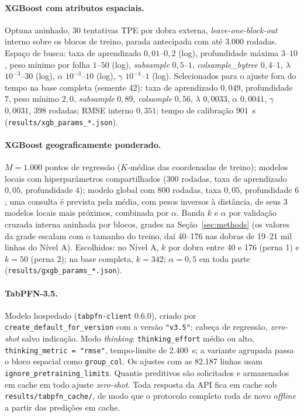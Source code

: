 \documentclass[11pt,a4paper]{article}
\begin{document}
\paragraph{XGBoost com atributos espaciais.} Optuna aninhado, 30 tentativas TPE por dobra
externa, \emph{leave-one-block-out} interno sobre os blocos de treino, parada antecipada com
até 3.000 rodadas. Espaço de busca: taxa de aprendizado $0{,}01$--$0{,}2$ (log), profundidade
máxima $3$--$10$, peso mínimo por folha $1$--$50$ (log), \emph{subsample} $0{,}5$--$1$,
\emph{colsample\_bytree} $0{,}4$--$1$, $\lambda$ $10^{-3}$--$30$ (log), $\alpha$
$10^{-3}$--$10$ (log), $\gamma$ $10^{-4}$--$1$ (log). Selecionados para o ajuste fora do tempo
na base completa (semente 42): taxa de aprendizado $0{,}049$, profundidade $7$, peso mínimo
$2{,}0$, \emph{subsample} $0{,}89$, \emph{colsample} $0{,}56$, $\lambda$ $0{,}0033$, $\alpha$
$0{,}0041$, $\gamma$ $0{,}0031$, $398$ rodadas; RMSE interno $0{,}351$; tempo de calibração
$901$~s (\texttt{results/xgb\_params\_*.json}).

\paragraph{XGBoost geograficamente ponderado.} $M = 1.000$ pontos de regressão ($K$-médias das
coordenadas de treino); modelos locais com hiperparâmetros compartilhados ($300$ rodadas, taxa
de aprendizado $0{,}05$, profundidade $4$); modelo global com $800$ rodadas, taxa $0{,}05$,
profundidade $6$; uma consulta é prevista pela média, com pesos inversos à distância, de seus
$3$ modelos locais mais próximos, combinada por $\alpha$. Banda $k$ e $\alpha$ por validação
cruzada interna aninhada por blocos, grades na Seção~\ref{sec:methods} (os valores da grade
escalam com o tamanho do treino, daí 40--176 nas dobras de 19--21 mil linhas do Nível A).
Escolhidos: no Nível A, $k$ por dobra entre 40 e 176 (perna 1) e $k = 50$ (perna 2); na base
completa, $k = 342$; $\alpha = 0{,}5$ em toda parte
(\texttt{results/gxgb\_params\_*.json}).

\paragraph{TabPFN-3.5.}\sloppy{} Modelo hospedado (\texttt{tabpfn-client} 0.6.0), criado por
\texttt{create\_default\_for\_version} com a versão \texttt{"v3.5"}; cabeça de regressão, \emph{zero-shot} salvo
indicação. Modo \emph{thinking}: \texttt{thinking\_effort} médio ou alto,
\texttt{thinking\_metric = "rmse"}, tempo-limite de 2.400~s; a variante agrupada passa o bloco
espacial como \texttt{group\_col}. Os ajustes com as 82.187 linhas usam
\texttt{ignore\_pretraining\_limits}. Quantis preditivos são solicitados e armazenados em cache
em todo ajuste \emph{zero-shot}. Toda resposta da API fica em cache sob
\texttt{results/tabpfn\_cache/}, de modo que o protocolo completo roda de novo \emph{offline} a
partir das predições em cache.\par\fussy
\end{document}
